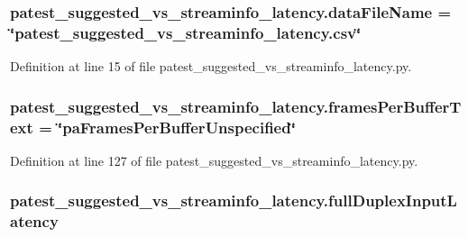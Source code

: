 \subsubsection[{\texorpdfstring{data\+File\+Name}{dataFileName}}]{ patest\+\_\+suggested\+\_\+vs\+\_\+streaminfo\+\_\+latency.\+data\+File\+Name = \char`\"{}patest\+\_\+suggested\+\_\+vs\+\_\+streaminfo\+\_\+latency.\+csv\char`\"{}}\hypertarget{namespacepatest__suggested__vs__streaminfo__latency_affbd9ac2873049fcdadb2cf2aad0949e}{}\label{namespacepatest__suggested__vs__streaminfo__latency_affbd9ac2873049fcdadb2cf2aad0949e}


Definition at line 15 of file patest\+\_\+suggested\+\_\+vs\+\_\+streaminfo\+\_\+latency.\+py.

\subsubsection[{\texorpdfstring{frames\+Per\+Buffer\+Text}{framesPerBufferText}}]{\setlength{\rightskip}{0pt plus 5cm}patest\+\_\+suggested\+\_\+vs\+\_\+streaminfo\+\_\+latency.\+frames\+Per\+Buffer\+Text = \char`\"{}pa\+Frames\+Per\+Buffer\+Unspecified\char`\"{}}\hypertarget{namespacepatest__suggested__vs__streaminfo__latency_a306ab567b84c29907e5f029ebd7358b0}{}\label{namespacepatest__suggested__vs__streaminfo__latency_a306ab567b84c29907e5f029ebd7358b0}


Definition at line 127 of file patest\+\_\+suggested\+\_\+vs\+\_\+streaminfo\+\_\+latency.\+py.

\subsubsection[{\texorpdfstring{full\+Duplex\+Input\+Latency}{fullDuplexInputLatency}}]{\setlength{\rightskip}{0pt plus 5cm}patest\+\_\+suggested\+\_\+vs\+\_\+streaminfo\+\_\+latency.\+full\+Duplex\+Input\+Latency}\hypertarget{namespacepatest__suggested__vs__streaminfo__latency_a326285d761c83012a72e8940344e788a}{}\label{namespacepatest__suggested__vs__streaminfo__latency_a326285d761c83012a72e8940344e788a}


